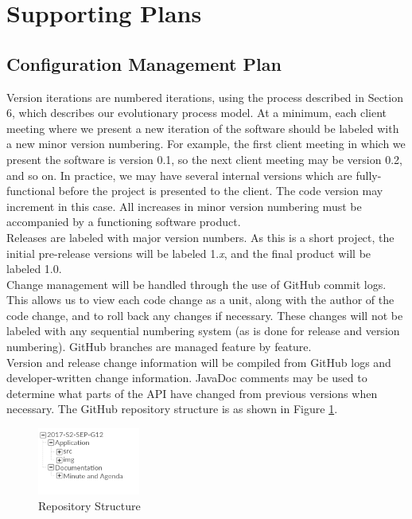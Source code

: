 \documentclass[12pt,a4paper]{article}
\begin{document}
	\section{Supporting Plans}
	\subsection{Configuration Management Plan}
    Version iterations are numbered iterations, using the process described in Section 6, which describes our evolutionary process model. At a minimum, each client meeting where we present a new iteration of the software should be labeled with a new minor version numbering. For example, the first client meeting in which we present the software is version 0.1, so the next client meeting may be version 0.2, and so on. In practice, we may have several internal versions which are fully-functional before the project is presented to the client. The code version may increment in this case. All increases in minor version numbering must be accompanied by a functioning software product.\\
    Releases are labeled with major version numbers. As this is a short project, the initial pre-release versions will be labeled 1.\textit{x}, and the final product will be labeled 1.0.\\
    Change management will be handled through the use of GitHub commit logs. This allows us to view each code change as a unit, along with the author of the code change, and to roll back any changes if necessary. These changes will not be labeled with any sequential numbering system (as is done for release and version numbering). GitHub branches are managed feature by feature.\\
    Version and release change information will be compiled from GitHub logs and developer-written change information. JavaDoc comments may be used to determine what parts of the API have changed from previous versions when necessary. The GitHub repository structure is as shown in Figure \ref{fig:structure}.
    
\begin{figure}[ht!]
\centering
\includegraphics[width=0.3\textwidth]{FolderStructure}
\caption{Repository Structure} 
\label{fig:structure}
\end{figure}
    
\end{document}
